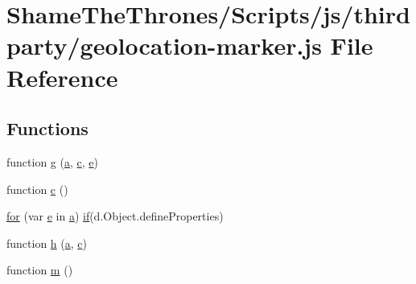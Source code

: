 \hypertarget{geolocation-marker_8js}{}\section{Shame\+The\+Thrones/\+Scripts/js/thirdparty/geolocation-\/marker.js File Reference}
\label{geolocation-marker_8js}
\subsection*{Functions}
\begin{DoxyCompactItemize}
\item 
function \hyperlink{geolocation-marker_8js_a9330f02e6b6960ad8e60b99fc78e5c6e}{g} (\hyperlink{_shame_the_thrones_2_scripts_2js_2thirdparty_2bootstrap_8min_8js_a1f5870dcf487187f13d5fd328ed9e6e7}{a}, \hyperlink{geolocation-marker_8js_a7e8c5fa5bd23f2aa7d476cf01190e2b7}{c}, \hyperlink{_shame_the_thrones_2_scripts_2js_2thirdparty_2bootstrap_8min_8js_ab5902775854a8b8440bcd25e0fe1c120}{e})
\item 
function \hyperlink{geolocation-marker_8js_a7e8c5fa5bd23f2aa7d476cf01190e2b7}{c} ()
\item 
\hyperlink{geolocation-marker_8js_a674dcfd7df577921c5bbb4ed10e5b7bf}{for} (var \hyperlink{_shame_the_thrones_2_scripts_2js_2thirdparty_2bootstrap_8min_8js_ab5902775854a8b8440bcd25e0fe1c120}{e} in \hyperlink{_shame_the_thrones_2_scripts_2js_2thirdparty_2bootstrap_8min_8js_a1f5870dcf487187f13d5fd328ed9e6e7}{a}) \hyperlink{_shame_the_thrones_2_scripts_2js_2thirdparty_2bootstrap_8min_8js_a6b611115d8c4976e4caeb4a3fbfade0f}{if}(d.\+Object.\+define\+Properties)
\item 
function \hyperlink{geolocation-marker_8js_a3fe6d5be0c02787190bb5772c9540ffb}{h} (\hyperlink{_shame_the_thrones_2_scripts_2js_2thirdparty_2bootstrap_8min_8js_a1f5870dcf487187f13d5fd328ed9e6e7}{a}, \hyperlink{geolocation-marker_8js_a7e8c5fa5bd23f2aa7d476cf01190e2b7}{c})
\item 
function \hyperlink{geolocation-marker_8js_a9f249b874ab77f3e34527102f741ac39}{m} ()
\end{DoxyCompactItemize}
